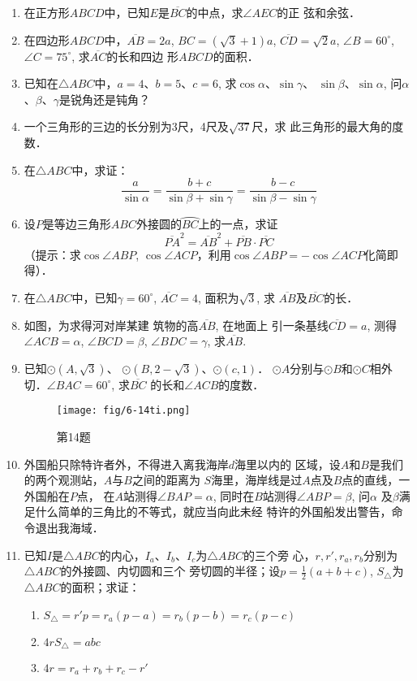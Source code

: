 \begin{enumerate}
\item 在正方形$ABCD$中，已知$E$是$\overline{BC}$的中点，求$\angle AEC$的正
弦和余弦．
\item 在四边形$ABCD$中，$\overline{AB}=2a$, $BC=(\sqrt{3}+1)a$, 
$\overline{CD}=\sqrt{2}a$, $\angle B=60^{\circ}$, $\angle C=75^{\circ}$, 求$\overline{AC}$的长和四边
形$ABCD$的面积．
\item 已知在$\triangle ABC$中，$a=4$、$b=5$、$c=6$, 求$\cos\alpha$、$\sin\gamma$、
$\sin\beta$、$\sin\alpha$, 问$\alpha$、$\beta$、$\gamma$是锐角还是钝角？
\item 一个三角形的三边的长分别为3尺，4尺及$\sqrt{37}$尺，求
此三角形的最大角的度数．
\item 在$\triangle ABC$中，求证：
\[\frac{a}{\sin\alpha}=\frac{b+c}{\sin\beta+\sin\gamma}=\frac{b-c}{\sin\beta-\sin\gamma}\]
\item 设$P$是等边三角形$ABC$外接圆的$\wideparen{BC}$上的一点，求证
\[\overline{PA}^2=\overline{AB}^2+\overline{PB}\cdot \overline{PC}\]
（提示：求$\cos\angle ABP$, $\cos\angle ACP$，利用$\cos\angle ABP=-\cos\angle ACP$化简即得）．
\item 在$\triangle ABC$中，已知$\gamma=60^{\circ}$, $\overline{AC}=4$, 面积为$\sqrt{3}$, 求
$\overline{AB}$及$\overline{BC}$的长．
\item 如图，为求得河对岸某建
筑物的高$\overline{AB}$, 在地面上
引一条基线$\overline{CD}=a$, 测得
$\angle ACB=\alpha$, $\angle BCD=\beta$, 
$\angle BDC=\gamma$, 求$\overline{AB}$.
\item 已知$\odot (A,\sqrt{3})$、
$\odot (B,2-\sqrt{3})$、$\odot (c,1)$．
$\odot A$分别与$\odot B$和$\odot C$相外
切．$\angle BAC=60^{\circ}$, 求$\overline{BC}$
的长和$\angle ACB$的度数．

\begin{figure}[htp]
    \centering
\texttt{[image: fig/6-14ti.png]}
    \caption*{第14题}
\end{figure}


\item 外国船只除特许者外，不得进入离我海岸$d$海里以内的
区域，设$A$和$B$是我们的两个观测站，$A$与$B$之间的距离为
$S$海里，海岸线是过$A$点及$B$点的直线，一外国船在$P$点，
在$A$站测得$\angle BAP=\alpha$, 同时在$B$站测得$\angle ABP=\beta$, 问$\alpha$
及$\beta$满足什么简单的三角比的不等式，就应当向此未经
特许的外国船发出警告，命令退出我海域．
\item 已知$I$是$\triangle ABC$的内心，$I_a$、$I_b$、$I_c$为$\triangle ABC$的三个旁
心，$r,r',r_a,r_b$分别为$\triangle ABC$的外接圆、内切圆和三个
旁切圆的半径；设$p=\frac{1}{2}(a+b+c)$, $S_{\triangle}$为$\triangle ABC$的面积；求证：
\begin{enumerate}
    \item $S_{\triangle}=r'p=r_a(p-a)=r_b(p-b)=r_c(p-c)$
    \item $4rS_{\triangle}=abc$
    \item $4r=r_a+r_b+r_c-r'$
\end{enumerate}


\end{enumerate}
